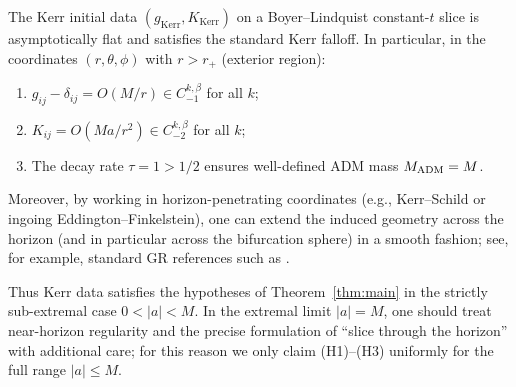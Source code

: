 \begin{remark}\label{rem:kerr-regularity}
The Kerr initial data $(g_{\mathrm{Kerr}}, K_{\mathrm{Kerr}})$ on a Boyer--Lindquist constant-$t$ slice is asymptotically flat and satisfies the standard Kerr falloff. In particular, in the coordinates $(r, \theta, \phi)$ with $r > r_+$ (exterior region):
\begin{enumerate}[label=(\roman*)]
    \item $g_{ij} - \delta_{ij} = O(M/r) \in C^{k,\beta}_{-1}$ for all $k$;
    \item $K_{ij} = O(Ma/r^2) \in C^{k,\beta}_{-2}$ for all $k$;
    \item The decay rate $\tau = 1 > 1/2$ ensures well-defined ADM mass $M_{\mathrm{ADM}} = M$.
\end{enumerate}
Moreover, by working in horizon-penetrating coordinates (e.g., Kerr--Schild or ingoing Eddington--Finkelstein), one can extend the induced geometry across the horizon (and in particular across the bifurcation sphere) in a smooth fashion; see, for example, standard GR references such as \cite{ChruscielCostaHeusler2012}.

Thus Kerr data satisfies the hypotheses of Theorem~\ref{thm:main} in the strictly sub-extremal case $0 < |a| < M$. In the extremal limit $|a|=M$, one should treat near-horizon regularity and the precise formulation of “slice through the horizon” with additional care; for this reason we only claim (H1)--(H3) uniformly for the full range $|a| \leq M$.
\end{remark}


